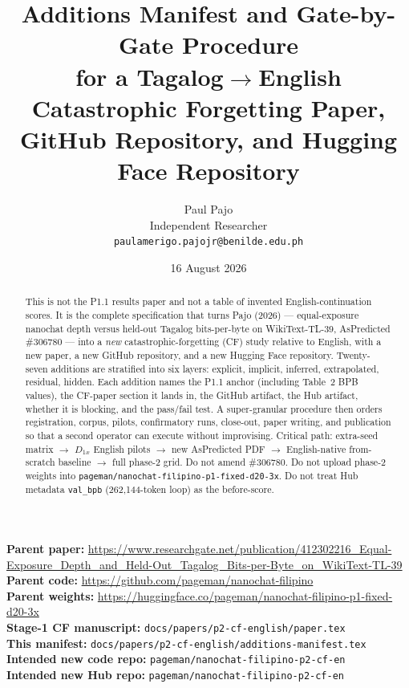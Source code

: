 \documentclass[11pt,a4paper]{article}
\title{Additions Manifest and Gate-by-Gate Procedure\\for a Tagalog$\rightarrow$English Catastrophic Forgetting Paper,\\GitHub Repository, and Hugging Face Repository}
\author{Paul Pajo\\
Independent Researcher\\
\texttt{paulamerigo.pajojr@benilde.edu.ph}}
\date{16 August 2026}
\begin{document}
\maketitle

\begin{abstract}
This is not the P1.1 results paper and not a table of invented English-continuation scores. It is the complete specification that turns Pajo (2026) --- equal-exposure nanochat depth versus held-out Tagalog bits-per-byte on WikiText-TL-39, AsPredicted \#306780 --- into a \emph{new} catastrophic-forgetting (CF) study relative to English, with a new paper, a new GitHub repository, and a new Hugging Face repository. Twenty-seven additions are stratified into six layers: explicit, implicit, inferred, extrapolated, residual, hidden. Each addition names the P1.1 anchor (including Table~2 BPB values), the CF-paper section it lands in, the GitHub artifact, the Hub artifact, whether it is blocking, and the pass/fail test. A super-granular procedure then orders registration, corpus, pilots, confirmatory runs, close-out, paper writing, and publication so that a second operator can execute without improvising. Critical path: extra-seed matrix $\rightarrow$ $D_{1x}$ English pilots $\rightarrow$ new AsPredicted PDF $\rightarrow$ English-native from-scratch baseline $\rightarrow$ full phase-2 grid. Do not amend \#306780. Do not upload phase-2 weights into \texttt{pageman/nanochat-filipino-p1-fixed-d20-3x}. Do not treat Hub metadata \texttt{val\_bpb} (262{,}144-token loop) as the before-score.
\end{abstract}

\noindent\textbf{Parent paper:} \url{https://www.researchgate.net/publication/412302216_Equal-Exposure_Depth_and_Held-Out_Tagalog_Bits-per-Byte_on_WikiText-TL-39}\\
\noindent\textbf{Parent code:} \url{https://github.com/pageman/nanochat-filipino}\\
\noindent\textbf{Parent weights:} \url{https://huggingface.co/pageman/nanochat-filipino-p1-fixed-d20-3x}\\
\noindent\textbf{Stage-1 CF manuscript:} \texttt{docs/papers/p2-cf-english/paper.tex}\\
\noindent\textbf{This manifest:} \texttt{docs/papers/p2-cf-english/additions-manifest.tex}\\
\noindent\textbf{Intended new code repo:} \texttt{pageman/nanochat-filipino-p2-cf-en}\\
\noindent\textbf{Intended new Hub repo:} \texttt{pageman/nanochat-filipino-p2-cf-en}
\end{document}
